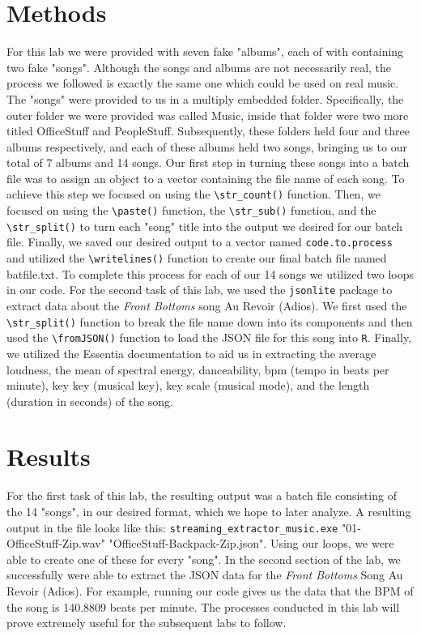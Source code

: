 \documentclass{article}\usepackage[]{graphicx}\usepackage[]{xcolor}
\begin{document}
\begin{multicols}{2}
\section{Methods}
For this lab we were provided with seven fake "albums", each of with containing two fake "songs". Although the songs and albums are not necessarily real, the process we followed is exactly the same one which could be used on real music. The "songs" were provided to us in a multiply embedded folder. Specifically, the outer folder we were provided was called Music, inside that folder were two more titled OfficeStuff and PeopleStuff. Subsequently, these folders held four and three albums respectively, and each of these albums held two songs, bringing us to our total of 7 albums and 14 songs. Our first step in turning these songs into a batch file was to assign an object to a vector containing the file name of each song. To achieve this step we focused on using the \verb|\str_count()| function. Then, we focused on using the \verb|\paste()| function, the \verb|\str_sub()| function, and the \verb|\str_split()| to turn each "song" title into the output we desired for our batch file. Finally, we saved our desired output to a vector named \texttt{code.to.process} and utilized the \verb|\writelines()| function to create our final batch file named batfile.txt. To complete this process for each of our 14 songs we utilized two loops in our code. For the second task of this lab, we used the \texttt{jsonlite} package to extract data about the \textit{Front Bottoms} song Au Revoir (Adios). We first used the \verb|\str_split()| function to break the file name down into its components and then used the \verb|\fromJSON()| function to load the JSON file for this song into \texttt{R}. Finally, we utilized the Essentia documentation to aid us in extracting the average loudness, the mean of spectral energy, danceability, bpm (tempo in beats per minute), key key (musical key), key scale (musical mode), and the length (duration in seconds) of the song.

\section{Results}
For the first task of this lab, the resulting output was a batch file consisting of the 14 "songs", in our desired format, which we hope to later analyze. A resulting output in the file looks like this: \texttt{streaming\_extractor\_music.exe} "01-OfficeStuff-Zip.wav" "OfficeStuff-Backpack-Zip.json". Using our loops, we were able to create one of these for every "song". In the second section of the lab, we successfully were able to extract the JSON data for the \textit{Front Bottoms} Song Au Revoir (Adios). For example, running our code gives us the data that the BPM of the song is 140.8809 beats per minute. The processes conducted in this lab will prove extremely useful for the subsequent labs to follow.


\end{multicols}
\end{document}
